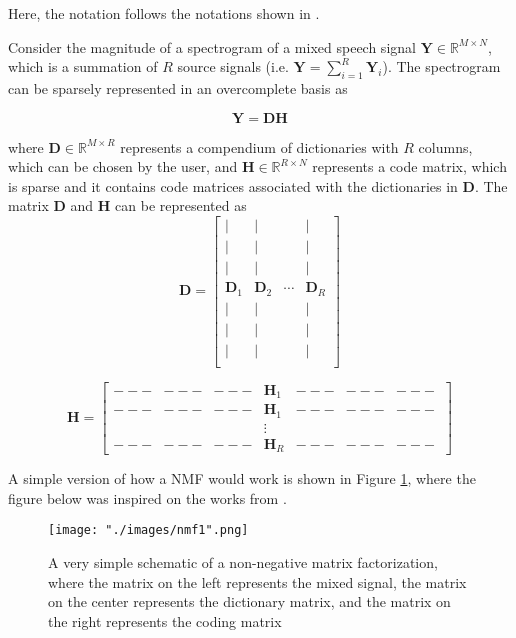 Here, the notation follows the notations shown in \cite{singlechannel}.

Consider the magnitude of a spectrogram of a mixed speech signal $\bm{Y} \in \mathbb{R}^{M\times N}$, which is a summation of $R$ source signals (i.e. $\bm{Y} = \sum_{i=1}^{R} \bm{Y}_i$). The spectrogram can be sparsely represented in an overcomplete basis as

$$\bm{Y} = \bm{D} \bm{H}$$

where $\bm{D} \in \mathbb{R}^{M \times R}$ represents a compendium of dictionaries with $R$ columns, which can be chosen by the user, and $\bm{H} \in \mathbb{R}^{R \times N}$ represents a code matrix, which is sparse and it contains code matrices associated with the dictionaries in $\bm{D}$. The matrix $\bm{D}$ and $\bm{H}$ can be represented as
\begin{equation*}
    \bm{D} = \begin{bmatrix}
    | & | & & | \\
    | & | & & | \\
    | & | & & | \\
    \bm{D}_1 & \bm{D}_2 & \cdots & \bm{D}_R \\
    | & | & & | \\
    | & | & & | \\
    | & | & & | \\
    \end{bmatrix}
\end{equation*}

\begin{equation*}
\bm{H} =
    \begin{bmatrix}
        --- & --- & --- & \bm{H}_1 & --- & --- & --- \\
        --- & --- & --- & \bm{H}_1 & --- & --- & --- \\
            &     &     & \vdots   &     &     &     \\
        --- & --- & --- & \bm{H}_R & --- & --- & --- \
    \end{bmatrix}
\end{equation*}

A simple version of how a NMF would work is shown in Figure \ref{fig::nmf_simple}, where the figure below was inspired on the works from \cite{singlechannel}.

\begin{figure}[H]
\begin{center}
    \texttt{[image: "./images/nmf1".png]}
    \caption{A very simple schematic of a non-negative matrix factorization, where the matrix on the left represents the mixed signal, the matrix on the center represents the dictionary matrix, and the matrix on the right represents the coding matrix}
    \label{fig::nmf_simple}
\end{center}
\end{figure}

